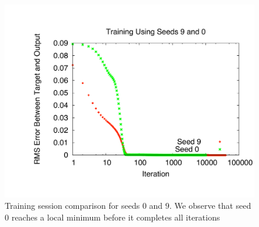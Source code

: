 \documentclass[11pt]{article}
\begin{document}
\begin{figure}[]
	\centering
		\includegraphics[width=0.85\columnwidth]{../bpgt-3.0/damping_test/Trainings.pdf}
	\caption{Training session comparison for seeds $0$ and $9$. We observe that seed $0$ reaches a local minimum before it completes all iterations}
	\label{fig:bpgt-3.0_damping_test_Trainings}
\end{figure}
\end{document}

